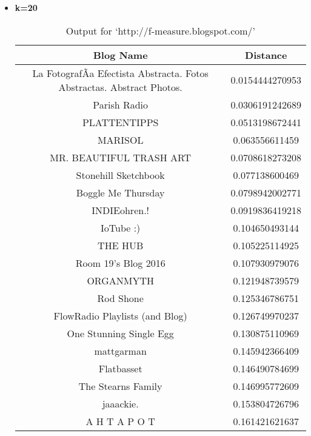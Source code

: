 \begin{itemize}
\newpage
\item \textbf{ k=20}
\begin{table}
\caption{Output for `http://f-measure.blogspot.com/'}
\label{q1table1}
\begin{center}
\hspace{-2cm}
\begin{tabular}{|c|c|}
\hline
 \textbf{Blog Name} & \textbf{Distance}\\ \hline
La FotografÃ­a Efectista Abstracta. Fotos Abstractas. Abstract  Photos. & 0.0154444270953	 \\ \hline
Parish Radio &    0.0306191242689	  \\ \hline
PLATTENTIPPS &    0.0513198672441	  \\ \hline
MARISOL&  0.063556611459	  \\ \hline
MR. BEAUTIFUL TRASH ART & 0.0708618273208	  \\ \hline
Stonehill Sketchbook  &   0.077138600469	  \\ \hline
Boggle Me Thursday   &    0.0798942002771	  \\ \hline
INDIEohren.! &    0.0919836419218	  \\ \hline
IoTube     :) &   0.104650493144	   \\ \hline
THE HUB & 0.105225114925	  \\ \hline
Room 19's Blog 2016   &   0.107930979076	  \\ \hline
ORGANMYTH &       0.121948739579	  \\ \hline
Rod Shone  &      0.125346786751	  \\ \hline
FlowRadio Playlists (and Blog)&   0.126749970237	  \\ \hline
One Stunning Single Egg & 0.130875110969	  \\ \hline
mattgarman    &   0.145942366409	  \\ \hline
Flatbasset  &     0.146490784699	   \\ \hline
The Stearns Family   &    0.146995772609	  \\ \hline
jaaackie.     &   0.153804726796	  \\ \hline
A H T A P O T  &  0.161421621637	  \\ \hline

\end{tabular}
\end{center}
\end{table}


\end{itemize}
